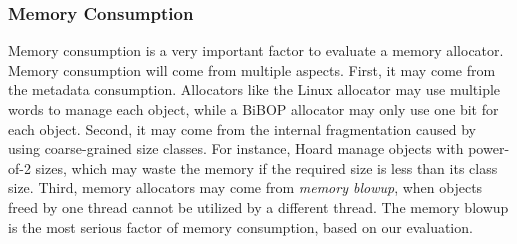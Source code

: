 \subsubsection{Memory Consumption}

Memory consumption is a very important factor to evaluate a memory allocator. Memory consumption will come from multiple aspects. First, it may come from the metadata consumption. Allocators like the Linux allocator may use multiple words to manage each object, while a BiBOP allocator may only use one bit for each object. Second, it may come from the internal fragmentation caused by using coarse-grained size classes. For instance, Hoard manage objects with power-of-2 sizes, which may waste the memory if the required size is less than its class size. Third, memory allocators may come from \textit{memory blowup}, when objects freed by one thread cannot be utilized by a different thread. The memory blowup is the most serious factor of memory consumption, based on our evaluation. 




